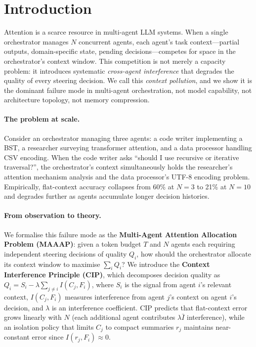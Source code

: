\documentclass{article}
\begin{document}
\section{Introduction}
\label{sec:intro}

Attention is a scarce resource in multi-agent LLM systems.
When a single orchestrator manages $N$ concurrent agents, each agent's
task context---partial outputs, domain-specific state, pending
decisions---competes for space in the orchestrator's context window.
This competition is not merely a capacity problem:
it introduces systematic \emph{cross-agent interference} that degrades
the quality of every steering decision.
We call this \emph{context pollution},
and we show it is the dominant failure mode in multi-agent orchestration,
not model capability, not architecture topology, not memory compression.

\paragraph{The problem at scale.}
Consider an orchestrator managing three agents: a code writer implementing
a BST, a researcher surveying transformer attention, and a data processor
handling CSV encoding.
When the code writer asks ``should I use recursive or iterative
traversal?'', the orchestrator's context simultaneously holds the
researcher's attention mechanism analysis and the data processor's UTF-8
encoding problem.
Empirically, flat-context accuracy collapses from 60\% at $N{=}3$ to
21\% at $N{=}10$ and degrades further as agents accumulate longer
decision histories.

\paragraph{From observation to theory.}
We formalise this failure mode as the \textbf{Multi-Agent Attention
Allocation Problem (MAAAP)}: given a token budget $T$ and $N$ agents
each requiring independent steering decisions of quality $Q_i$, how
should the orchestrator allocate its context window to
maximise $\sum_i Q_i$?
We introduce the \textbf{Context Interference Principle (CIP)},
which decomposes decision quality as
$Q_i = S_i - \lambda \sum_{j \neq i} I(C_j, F_i)$,
where $S_i$ is the signal from agent $i$'s relevant context,
$I(C_j, F_i)$ measures interference from agent $j$'s context on
agent $i$'s decision, and $\lambda$ is an interference coefficient.
CIP predicts that flat-context error grows linearly with $N$
(each additional agent contributes $\lambda \bar{I}$ interference),
while an isolation policy that limits $C_j$ to compact summaries
$r_j$ maintains near-constant error since $I(r_j, F_i) \approx 0$.
\end{document}
